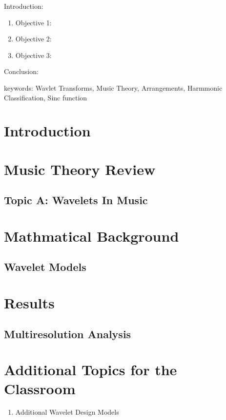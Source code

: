 


\twocolumn
\scriptsize
\begin{frontmatter}
		\title{}
		\author{}
		\address{The Mathematical Learning Space}
\end{frontmatter}	

Introduction:
\begin{enumerate}
\item Objective 1:
\item Objective 2:
\item Objective 3:
\end{enumerate}
Conclusion:

keywords: Wavlet Transforms, Music Theory, Arrangements, Harmmonic Classification, Sinc function

\section{Introduction}


\section{Music Theory Review}

\subsection{Topic A: Wavelets In Music}

\section{Mathmatical Background}

\subsection{Wavelet Models}

\section{Results}

\subsection{Multiresolution Analysis}


\section{Additional Topics for the Classroom}

\begin{enumerate}
\item Additional Wavelet Design Models
\end{enumerate}



\begin{thebibliography}{00}

\end{thebibliography}


